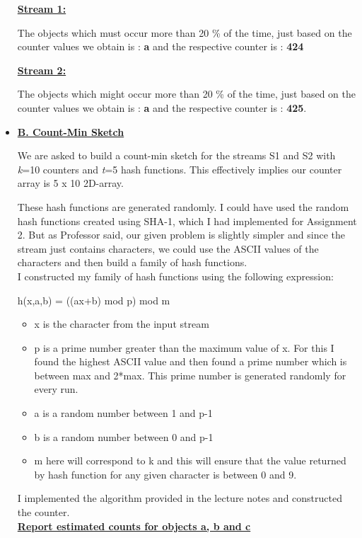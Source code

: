 \documentclass[11pt]{article}
\begin{document}
\begin{itemize}
	\textbf{\underline{Stream 1:}}
	
	The objects which must occur more than 20 \% of the time, just based on the counter values we obtain is : \textbf{a}  and the respective counter is : \textbf{424}
	
	\textbf{\underline{Stream 2:}}
	
	The objects which might occur more than 20 \% of the time, just based on the counter values we obtain is : \textbf{a}  and the respective counter is : \textbf{425}.	
	
	
	\item[] \underline{\textbf{B. Count-Min Sketch}}
	
	We are asked to build a count-min sketch for the streams S1 and S2 with \emph k=10 counters and \emph t=5 hash functions. This effectively implies our counter array is 5 x 10  2D-array.
	
	These hash functions are generated randomly. I could have used the random hash functions created using SHA-1, which I had implemented for Assignment 2. But as Professor said, our given problem is slightly simpler and since the stream just contains characters, we could use the ASCII values of the characters and then build a family of hash functions.\\
	
		I constructed my family of hash functions using the following expression:
	
	h(x,a,b) = ((ax+b) mod p) mod m
	
	\begin{itemize}
		\item x is the character from the input stream
		\item p is a prime number greater than the maximum value of x. For this I found the highest ASCII value and then found a prime number which is between max and 2*max. This prime number is generated randomly for every run.
		\item a is a random number between 1 and p-1
		\item b is a random number between 0 and p-1
		\item m here will correspond to k and this will ensure that the value returned by hash function for any given character is between 0 and 9.
	\end{itemize}
	
I implemented the algorithm provided in the lecture notes and constructed the counter. \\


\textbf{\underline{Report estimated counts for objects a, b and c}} \\


\end{itemize}
\end{document}
